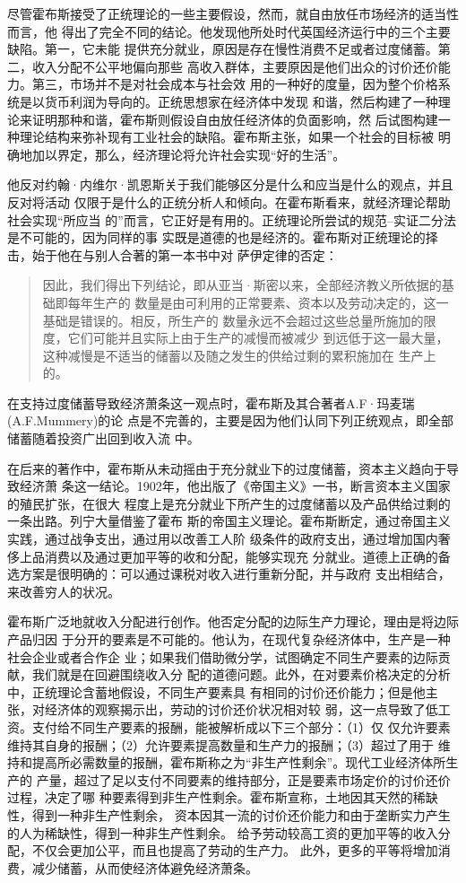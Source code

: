 尽管霍布斯接受了正统理论的一些主要假设，然而，就自由放任市场经济的适当性而言，他
得出了完全不同的结论。他发现他所处时代英国经济运行中的三个主要缺陷。第一，它未能
提供充分就业，原因是存在慢性消费不足或者过度储蓄。第二，收入分配不公平地偏向那些
高收入群体，主要原因是他们出众的讨价还价能力。第三，市场并不是对社会成本与社会效
用的一种好的度量，因为整个价格系统是以货币利润为导向的。正统思想家在经济体中发现
和谐，然后构建了一种理论来证明那种和谐，霍布斯则假设自由放任经济体的负面影响，然
后试图构建一种理论结构来弥补现有工业社会的缺陷。霍布斯主张，如果一个社会的目标被
明确地加以界定，那么，经济理论将允许社会实现“好的生活”。

他反对约翰·内维尔·凯恩斯关于我们能够区分是什么和应当是什么的观点，并且反对将活动
仅限于是什么的正统分析人和倾向。在霍布斯看来，就经济理论帮助社会实现“所应当
的”而言，它正好是有用的。正统理论所尝试的规范--实证二分法是不可能的，因为同样的事
实既是道德的也是经济的。霍布斯对正统理论的择击，始于他在与别人合著的第一本书中对
萨伊定律的否定：

\begin{quotation}
  因此，我们得出下列结论，即从亚当·斯密以来，全部经济教义所依据的基础即每年生产的
  数量是由可利用的正常要素、资本以及劳动决定的，这一基础是错误的。相反，所生产的
  数量永远不会超过这些总量所施加的限度，它们可能并且实际上由于生产的减慢而被减少
  到远低于这一最大量，这种减慢是不适当的储蓄以及随之发生的供给过剩的累积施加在
  生产上的。
\end{quotation}

在支持过度储蓄导致经济萧条这一观点时，霍布斯及其合著者A.F·玛麦瑞(A.F.Mummery)的论
点是不完善的，主要是因为他们认同下列正统观点，即全部储蓄随着投资广出回到收入流
中。

在后来的著作中，霍布斯从未动摇由于充分就业下的过度储蓄，资本主义趋向于导致经济萧
条这一结论。1902年，他出版了《帝国主义》一书，断言资本主义国家的殖民扩张，在很大
程度上是充分就业下所产生的过度储蓄以及产品供给过剩的一条出路。列宁大量借鉴了霍布
斯的帝国主义理论。霍布斯断定，通过帝国主义实践，通过战争支出，通过用以改善工人阶
级条件的政府支出，通过增加国内奢侈上品消费以及通过更加平等的收和分配，能够实现充
分就业。道德上正确的备选方案是很明确的：可以通过课税对收入进行重新分配，并与政府
支出相结合，来改善穷人的状况。

霍布斯广泛地就收入分配进行创作。他否定分配的边际生产力理论，理由是将边际产品归因
于分开的要素是不可能的。他认为，在现代复杂经济体中，生产是一种社会企业或者合作企
业；如果我们借助微分学，试图确定不同生产要素的边际贡献，我们就是在回避围绕收入分
配的道德问题。此外，在对要素价格决定的分析中，正统理论含蓄地假设，不同生产要素具
有相同的讨价还价能力；但是他主张，对经济体的观察揭示出，劳动的讨价还价状况相对较
弱，这一点导致了低工资。支付给不同生产要素的报酬，能被解析成以下三个部分：（1）仅
仅允许要素维持其自身的报酬；（2）允许要素提高数量和生产力的报酬；（3）超过了用于
维持和提高所必需数量的报酬，霍布斯称之为“非生产性剩余”。现代工业经济体所生产的
产量，超过了足以支付不同要素的维持部分，正是要素市场定价的讨价还价过程，决定了哪
种要素得到非生产性剩余。霍布斯宣称，土地因其天然的稀缺性，得到一种非生产性剩余，
资本因其一流的讨价还价能力和由于垄断实力产生的人为稀缺性，得到一种非生产性剩余。
给予劳动较高工资的更加平等的收入分配，不仅会更加公平，而且也提高了劳动的生产力。
此外，更多的平等将增加消费，减少储蓄，从而使经济体避免经济萧条。

